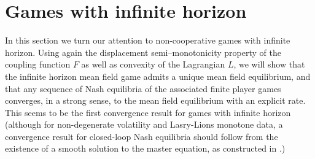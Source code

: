 \documentclass[11pt,reqno]{amsart}
\numberwithin{equation}{section}
\theoremstyle{definition}
\def\E{{\mathbb E}}
\newcommand{\bX}{\mathbf{X}}
\newcommand{\sF}{\mathcal{F}}
\newcommand{\ov}{\overline}
\def \E{\mathbb{E}}
\begin{document}

\section{Games with infinite horizon} \label{subsec:infinite}
In this section we turn our attention to non-cooperative games with infinite horizon.
Using again the displacement semi--monotonicity property of the coupling function $F$ as well as convexity of the Lagrangian $L$, we will show that the infinite horizon mean field game admits a unique mean field equilibrium, and that any sequence of Nash equilibria of the associated finite player games converges, in a strong sense, to the mean field equilibrium with an explicit rate.
This seems to be the first convergence result for games with infinite horizon (although for non-degenerate volatility and Lasry-Lions monotone data, a convergence result for closed-loop Nash equilibria should follow from the existence of a smooth solution to the master equation, as constructed in \cite{cardporetta}.)
\end{document}
